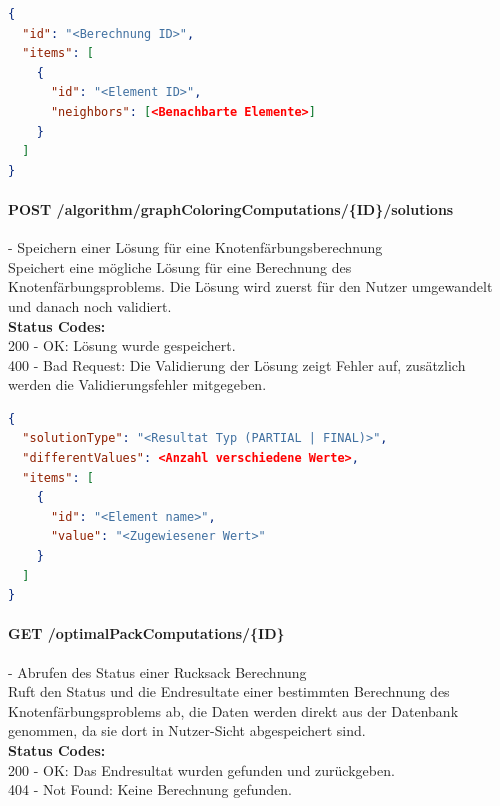 \begin{lstlisting}[language=JSON, caption=Beispiel für Eingabedaten des Knotenfärbungsproblems für den Algorithmus, label=lst:input_graphcoloring_algo]  
{
  "id": "<Berechnung ID>",
  "items": [
    {
      "id": "<Element ID>",
      "neighbors": [<Benachbarte Elemente>]
    }
  ]
}
\end{lstlisting}

\paragraph{POST /algorithm/graphColoringComputations/\{ID\}/solutions} - Speichern einer Lösung für eine Knotenfärbungsberechnung\mbox{}\\
Speichert eine mögliche Lösung für eine Berechnung des Knotenfärbungsproblems. Die Lösung wird zuerst für den Nutzer umgewandelt und danach noch validiert.\\
\textbf{Status Codes:}\\
200 - OK: Lösung wurde gespeichert.\\
400 - Bad Request: Die Validierung der Lösung zeigt Fehler auf, zusätzlich werden die Validierungsfehler mitgegeben.\\

\begin{lstlisting}[language=JSON, caption=Beispiel eines Resultates für das Knotenfärbungsproblems aus Algorithmus-Sicht, label=lst:solution_graphcoloring_algo]  
{
  "solutionType": "<Resultat Typ (PARTIAL | FINAL)>",
  "differentValues": <Anzahl verschiedene Werte>,
  "items": [
    {
      "id": "<Element name>",
      "value": "<Zugewiesener Wert>"
    }
  ]
}
\end{lstlisting}

\paragraph{GET /optimalPackComputations/\{ID\}} - Abrufen des Status einer Rucksack Berechnung\mbox{}\\
Ruft den Status und die Endresultate einer bestimmten Berechnung des Knotenfärbungsproblems ab, die Daten werden direkt aus der Datenbank genommen, da sie dort in Nutzer-Sicht abgespeichert sind.\\
\textbf{Status Codes:}\\
200 - OK: Das Endresultat wurden gefunden und zurückgeben.\\
404 - Not Found: Keine Berechnung gefunden.\\

